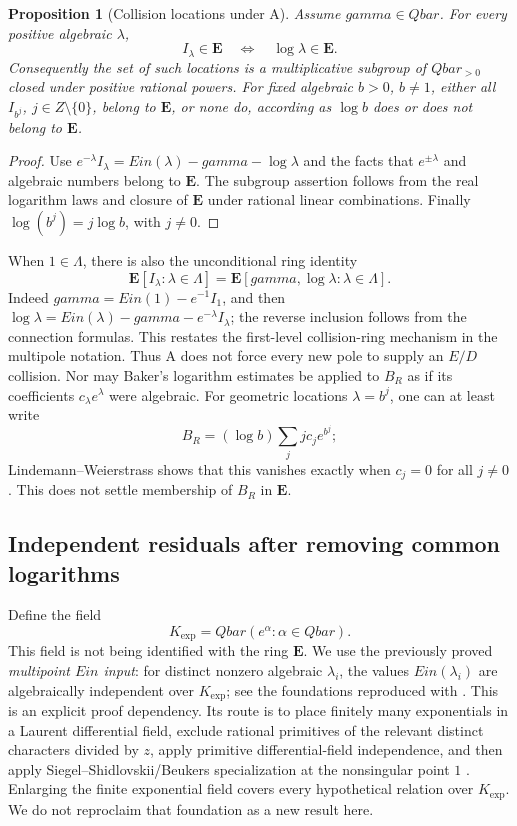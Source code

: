 \documentclass[11pt,a4paper]{article}
\newcommand{\Z}{\mathbb Z}
\newcommand{\QB}{\overline{\mathbb Q}}
\newcommand{\Qbar}{\overline{\mathbb Q}}
\DeclareMathOperator{\Ein}{Ein}
\newtheorem{proposition}[theorem]{Proposition}
\theoremstyle{definition}
\theoremstyle{remark}
\theoremstyle{plain}
\numberwithin{equation}{section}
\def\Ein{Ein}\def\gamma{gamma}\def\delta{delta}\def\eta{eta}%
\def\Qbar{Qbar}\def\QB{Qbar}\def\mathbb#1{#1}%
\begin{document}
\begin{proposition}[Collision locations under $\mathrm A$]\label{em:mul:membership}
Assume $\gamma\in\Qbar$.  For every positive algebraic $\lambda$,
\[
 I_\lambda\in\mathbf E\quad\Longleftrightarrow\quad
 \log\lambda\in\mathbf E.
\]
Consequently the set of such locations is a multiplicative subgroup of
$\Qbar_{>0}$ closed under positive rational powers.  For fixed algebraic
$b>0$, $b\ne1$, either all $I_{b^j}$, $j\in\Z\setminus\{0\}$, belong
to $\mathbf E$, or none do, according as $\log b$ does or does not belong
to $\mathbf E$.
\end{proposition}
\begin{proof}
Use $e^{-\lambda}I_\lambda=\Ein(\lambda)-\gamma-\log\lambda$ and the
facts that $e^{\pm\lambda}$ and algebraic numbers belong to $\mathbf E$.
The subgroup assertion follows from the real logarithm laws and closure
of $\mathbf E$ under rational linear combinations.  Finally
$\log(b^j)=j\log b$, with $j\ne0$.
\end{proof}
When $1\in\Lambda$, there is also the unconditional ring identity
\[
 \mathbf E[I_\lambda:\lambda\in\Lambda]
 =\mathbf E[\gamma,\log\lambda:\lambda\in\Lambda].
\]
Indeed $\gamma=\Ein(1)-e^{-1}I_1$, and then
$\log\lambda=\Ein(\lambda)-\gamma-e^{-\lambda}I_\lambda$; the reverse
inclusion follows from the connection formulas. This restates the
first-level collision-ring mechanism in the multipole notation.
Thus $\mathrm A$ does not force every new pole to supply an $E/D$
collision.  Nor may Baker's logarithm estimates be applied to $B_R$ as
if its coefficients $c_\lambda e^\lambda$ were algebraic.  For geometric
locations $\lambda=b^j$, one can at least write
\[
 B_R=(\log b)\sum_j jc_j e^{b^j};
\]
Lindemann--Weierstrass shows that this vanishes exactly when $c_j=0$
for all $j\ne0$.  This does not settle membership of $B_R$ in $\mathbf E$.

\subsection{Independent residuals after removing common logarithms}
Define the field
\[
 K_{\exp}=\Qbar(e^\alpha:\alpha\in\Qbar).
\]
This field is not being identified with the ring $\mathbf E$.
We use the previously proved \emph{multipoint $\Ein$ input}: for distinct
nonzero algebraic $\lambda_i$, the values $\Ein(\lambda_i)$ are
algebraically independent over $K_{\exp}$; see the foundations reproduced
with \cite{Previous}.  This is an explicit proof dependency.  Its route
is to place finitely many exponentials in a Laurent differential field,
exclude rational primitives of the relevant distinct characters divided
by $z$, apply primitive differential-field independence, and then apply
Siegel--Shidlovskii/Beukers specialization at the nonsingular point $1$
\cite{Beukers}.  Enlarging the finite exponential field covers every
hypothetical relation over $K_{\exp}$.  We do not reproclaim that foundation
as a new result here.
\end{document}
